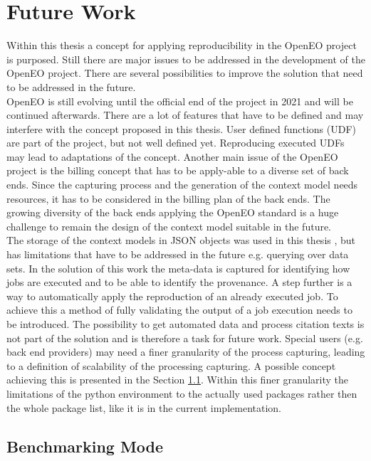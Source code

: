 \documentclass[draft,final]{vutinfth} %
\begin{document}
\section{Future Work}\label{FutureWork}
Within this thesis a concept for applying reproducibility in the OpenEO project is purposed. Still there are major issues to be addressed in the development of the OpenEO project. There are several possibilities to improve the solution that need to be addressed in the future. \\
OpenEO is still evolving until the official end of the project in 2021 and will be continued afterwards. There are a lot of features that have to be defined and may interfere with the concept proposed in this thesis. User defined functions (UDF) are part of the project, but not well defined yet. Reproducing executed UDFs may lead to adaptations of the concept. Another main issue of the OpenEO project is the billing concept that has to be apply-able to a diverse set of back ends. Since the capturing process and the generation of the context model needs resources, it has to be considered in the billing plan of the back ends. The growing diversity of the back ends applying the OpenEO standard is a huge challenge to remain the design of the context model suitable in the future. \\
The storage of the context models in JSON objects was used in this thesis , but has limitations that have to be addressed in the future e.g. querying over data sets. 
In the solution of this work the meta-data is captured for identifying how jobs are executed and to be able to identify the provenance. A step further is a way to automatically apply the reproduction of an already executed job. To achieve this a method of fully validating the output of a job execution needs to be introduced. The possibility to get automated data and process citation texts is not part of the solution and is therefore a task for future work. Special users (e.g. back end providers) may need a finer granularity of the process capturing, leading to a definition of scalability of the processing capturing. A possible concept achieving this is presented in the Section \ref{Job:Benchmarking}. Within this finer granularity the limitations of the python environment to the actually used packages rather then the whole package list, like it is in the current implementation.       

\subsection{Benchmarking Mode}\label{Job:Benchmarking}
\end{document}
